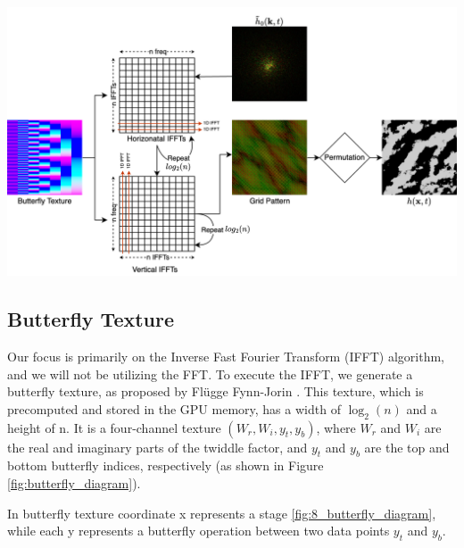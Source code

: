 \begin{minipage}{1\textwidth}
    \centering
    \includegraphics[width=1\textwidth]{"images/ifft_algorithm.png"}
    \label{fig:ifft_algorithm}
\end{minipage}

\subsection{Butterfly Texture}

Our focus is primarily on the Inverse Fast Fourier Transform (IFFT) algorithm, and we will not be utilizing the FFT. To execute the IFFT, we generate a butterfly texture, as proposed by Fl{\"u}gge Fynn-Jorin \cite{flugge2017}. This texture, which is precomputed and stored in the GPU memory, has a width of $\log_2(n)$ and a height of n. It is a four-channel texture $(W_r,W_i,y_t,y_b)$, where $W_r$ and $W_i$ are the real and imaginary parts of the twiddle factor, and $y_t$ and $y_b$ are the top and bottom butterfly indices, respectively (as shown in Figure \ref{fig:butterfly_diagram}).

In butterfly texture coordinate x represents a stage \ref{fig:8_butterfly_diagram}, while each y represents a butterfly operation between two data points $y_t$ and $y_b$.

